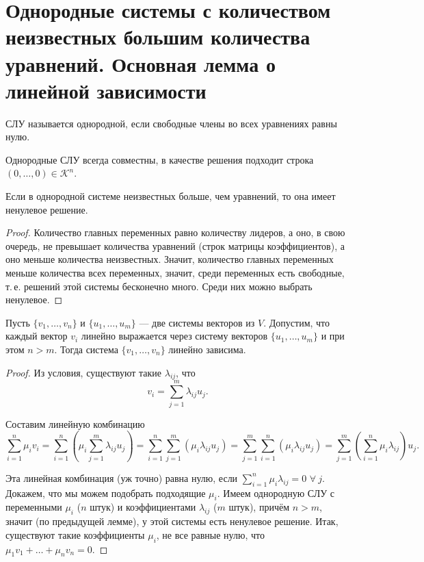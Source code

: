 \section{Однородные системы с количеством неизвестных большим количества уравнений. Основная лемма о линейной зависимости}

\begin{definition}
    СЛУ называется однородной, если свободные члены во всех уравнениях равны нулю.
\end{definition}

\begin{remark}
    Однородные СЛУ всегда совместны, в качестве решения подходит строка $(0, \ldots, 0) \in \mathcal{K}^n$.
\end{remark}

\begin{lemma}
    Если в однородной системе неизвестных больше, чем уравнений, то она имеет ненулевое решение.
\end{lemma}

\begin{proof}
    Количество главных переменных равно количеству лидеров, а оно, в свою очередь, не превышает количества уравнений (строк матрицы коэффициентов), а оно меньше количества неизвестных. Значит, количество главных переменных меньше количества всех переменных, значит, среди переменных есть свободные, т.\,е. решений этой системы бесконечно много. Среди них можно выбрать ненулевое.
\end{proof}

\begin{lemma}
    Пусть $\{v_1, \ldots, v_n\}$ и $\{u_1, \ldots, u_m\}$ --- две системы векторов из $V$. Допустим, что каждый вектор $v_i$ линейно выражается через систему векторов $\{u_1, \ldots, u_m\}$ и при этом $n > m$. Тогда система $\{v_1, \ldots, v_n\}$ линейно зависима.
\end{lemma}

\begin{proof}
    Из условия, существуют такие $\lambda_{ij}$, что
    $$
    v_i = \sum_{j = 1}^m\lambda_{ij}u_j.
    $$


    Составим линейную комбинацию
    $$
    \sum_{i = 1}^n\mu_iv_i = \sum_{i = 1}^n\left(\mu_i\sum_{j = 1}^m\lambda_{ij}u_j\right) = \sum_{i = 1}^n\sum_{j = 1}^m(\mu_i\lambda_{ij}u_j) = \sum_{j = 1}^m\sum_{i = 1}^n(\mu_i\lambda_{ij}u_j) = \sum_{j = 1}^m\left(\sum_{i = 1}^n\mu_i\lambda_{ij}\right)u_j.
    $$

    Эта линейная комбинация (уж точно) равна нулю, если $\displaystyle \sum_{i = 1}^n\mu_i\lambda_{ij} = 0$ $\forall\!\:j$. Докажем, что мы можем подобрать подходящие $\mu_i$. Имеем однородную СЛУ с переменными $\mu_i$ ($n$ штук) и коэффициентами $\lambda_{ij}$ ($m$ штук), причём $n > m$, значит (по предыдущей лемме), у этой системы есть ненулевое решение. Итак, существуют такие коэффициенты $\mu_i$, не все равные нулю, что $\mu_1v_1 + \ldots + \mu_nv_n = 0$.
\end{proof}

